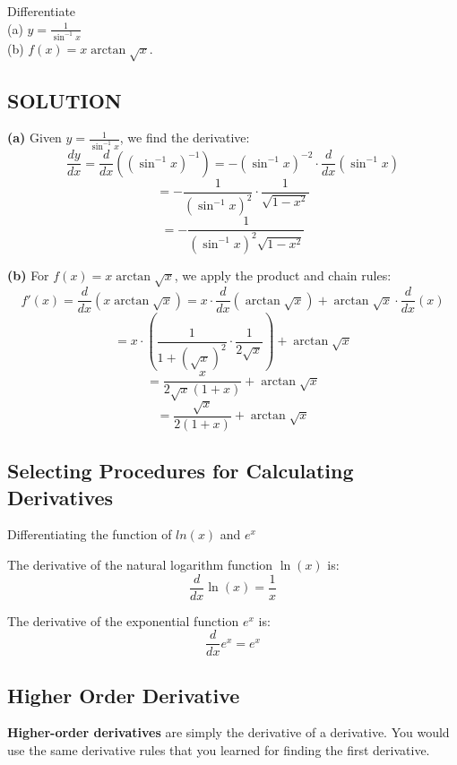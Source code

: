 \documentclass[12pt]{article}
\theoremstyle{beautifulthm}
\begin{document}
\begin{tcolorbox}[colback=examplebg, colframe=red!75!black, title=\textbf{EXAMPLE 1: Using a Tangent Line Approximation}, fonttitle=\bfseries, sharp corners]
Differentiate \\
(a) \( y = \frac{1}{\sin^{-1} x} \) \\
(b) \( f(x) = x \arctan \sqrt{x} \).

\tcblower

\subsection*{SOLUTION}
\textbf{(a)} Given \( y = \frac{1}{\sin^{-1} x} \), we find the derivative:
\[
\frac{dy}{dx} = \frac{d}{dx} \left( (\sin^{-1} x)^{-1} \right) = -(\sin^{-1} x)^{-2} \cdot \frac{d}{dx} (\sin^{-1} x)
\]
\[
= -\frac{1}{(\sin^{-1} x)^2} \cdot \frac{1}{\sqrt{1 - x^2}}
\]
\[
= -\frac{1}{(\sin^{-1} x)^2 \sqrt{1 - x^2}}
\]

\textbf{(b)} For \( f(x) = x \arctan \sqrt{x} \), we apply the product and chain rules:
\[
f'(x) = \frac{d}{dx} \left( x \arctan \sqrt{x} \right) = x \cdot \frac{d}{dx}(\arctan \sqrt{x}) + \arctan \sqrt{x} \cdot \frac{d}{dx}(x)
\]
\[
= x \cdot \left( \frac{1}{1 + (\sqrt{x})^2} \cdot \frac{1}{2\sqrt{x}} \right) + \arctan \sqrt{x}
\]
\[
= \frac{x}{2\sqrt{x}(1+x)} + \arctan \sqrt{x}
\]
\[
= \frac{\sqrt{x}}{2(1+x)} + \arctan \sqrt{x}
\]

\end{tcolorbox}


\newpage

\subsection{Selecting Procedures for Calculating Derivatives}
\begin{Note}{Differentiating the function of $ln(x)$ and $e^x$}{}


The derivative of the natural logarithm function \( \ln(x) \) is:
\[
\frac{d}{dx} \ln(x) = \frac{1}{x}
\]

The derivative of the exponential function \( e^x \) is:
\[
\frac{d}{dx} e^x = e^x
\]

\end{Note}






\newpage
\subsection{Higher Order Derivative}
\textbf{Higher-order derivatives} are simply the derivative of a derivative. You would use the same derivative rules that you learned for finding the first derivative.
\end{document}
